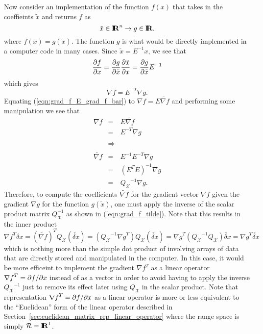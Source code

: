 Now consider an implementation of the function $f(x)$ that takes in the coeffieints
$\tilde{x}$ and returns $f$ as
%
\[
\tilde{x}\in\mbox{\textbf{I}}\hspace{-0.6ex}\mbox{\textbf{R}}^n \rightarrow g\in\mbox{\textbf{I}}\hspace{-0.6ex}\mbox{\textbf{R}}.
\]
%
where $f(x) = g(\tilde{x})$.  The function $g$ is what would be
directly implemented in a computer code in many cases.  Since $\tilde{x} =
E^{-1} x$, we see that
%
\[
\displaystyle{\frac{\partial f}{\partial x}} = \displaystyle{\frac{\partial g}{\partial \tilde{x}}} \displaystyle{\frac{\partial \tilde{x}}{\partial x}}  = \displaystyle{\frac{\partial g}{\partial \tilde{x}}} E^{-1}
\]
%
which gives
%
\begin{equation}
\nabla f = E^{-T} \nabla g.
\label{eqn:grad_f_E_grad_f_bar}
\end{equation}
%
Equating (\ref{eqn:grad_f_E_grad_f_bar}) to $\nabla f = E {}\tilde{\nabla f}$
and performing some manipulation we see that
%
\begin{eqnarray}
\nabla f
& = & E \tilde{\nabla f} \nonumber \\
& = & E^{-T} \nabla g \nonumber \\
& & \nonumber \\
& \Rightarrow & \nonumber \\
& & \nonumber \\
\tilde{\nabla f}
& = & E^{-1} E^{-T} \nabla g \nonumber \\
& = & (E^T E)^{-1} \nabla g \nonumber \\
& = & {Q_{\mathcal{X}}}^{-1} \nabla g.
\label{eqn:grad_f_tilde}
\end{eqnarray}
%
Therefore, to compute the coefficients $\tilde{\nabla f}$ for the gradient
vector $\nabla f$ given the gradient $\nabla g$ for the function
$g(\tilde{x})$, one must apply the inverse of the scalar product matrix
$Q_{\mathcal{X}}^{-1}$ as shown in (\ref{eqn:grad_f_tilde}).  Note that this
results in the inner product
%
\[
{\nabla f}^T \delta x = (\tilde{\nabla f})^T Q_{\mathcal{X}} (\tilde{\delta x})
= ({Q_{\mathcal{X}}}^{-1} {\nabla g}^T) Q_{\mathcal{X}} (\tilde{\delta x})
= {\nabla g}^T ( {Q_{\mathcal{X}}}^{-1} Q_{\mathcal{X}} ) \tilde{\delta x}
= {\nabla g}^T \tilde{\delta x}
\]
%
which is nothing more than the simple dot product of involving arrays of data
that are directly stored and manipulated in the computer.  In this case, it
would be more efficeint to implement the gradient ${\nabla f}^T$ as a linear
operator ${\nabla f}^T = {}\partial f / \partial x$ instead of as a vector in order to
avoid having to apply the inverse ${Q_{\mathcal{X}}}^{-1}$ just to remove its
effect later using $Q_{\mathcal{X}}$ in the scalar product.  Note that
representation ${\nabla f}^T = {}\partial f / \partial x$ as a linear operator is more or
less equivalent to the ``Euclidean'' form of the linear operator described in
Section~\ref{sec:euclidean_matrix_rep_linear_operator} where the range space
is simply $\mathcal{R}=\mbox{\textbf{I}}\hspace{-0.6ex}\mbox{\textbf{R}}^1$.

